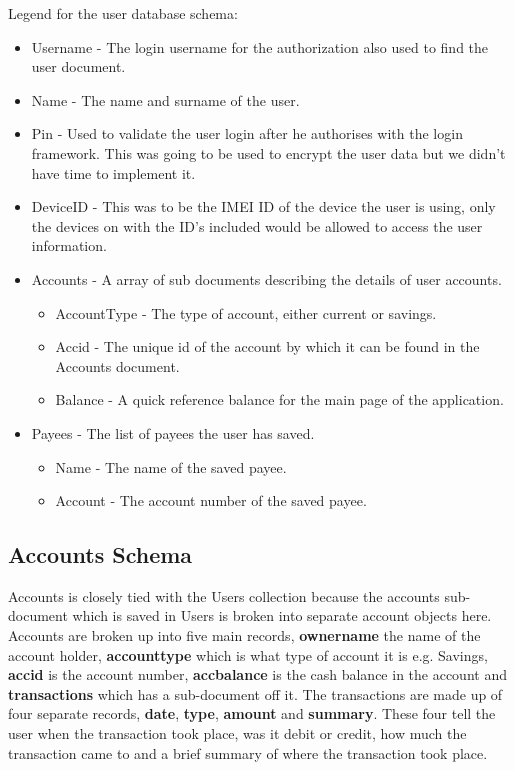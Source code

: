 Legend for the user database schema: 
\begin{itemize}
    \item Username - The login username for the authorization also used to find the user document.
    \item Name - The name and surname of the user.
    \item Pin - Used to validate the user login after he authorises with the login framework. This was going to be used to encrypt the user data but we didn't have time to implement it.
    \item DeviceID - This was to be the IMEI ID of the device the user is using, only the devices on with the ID's included would be allowed to access the user information.
    \item Accounts - A array of sub documents describing the details of user accounts.
        \begin{itemize}
             \item AccountType - The type of account, either current or savings.
             \item Accid - The unique id of the account by which it can be found in the Accounts document.
             \item Balance - A quick reference balance for the main page of the application.
        \end{itemize}
    \item Payees - The list of payees the user has saved.
        \begin{itemize}
            \item Name - The name of the saved payee.
            \item Account - The account number of the saved payee.
        \end{itemize}
\end{itemize}

 
 \subsection{Accounts Schema}
Accounts is closely tied with the Users collection because the accounts sub-document which is saved in Users is broken into separate account objects here. Accounts are broken up into five main records, \textbf{ownername} the name of the account holder, \textbf{accounttype} which is what type of account it is e.g. Savings, \textbf{accid} is the account number, \textbf{accbalance} is the cash balance in the account and \textbf{transactions} which has a sub-document off it. The transactions are made up of four separate records, \textbf{date}, \textbf{type}, \textbf{amount} and \textbf{summary}. These four tell the user when the transaction took place, was it debit or credit, how much the transaction came to and a brief summary of where the transaction took place.\paragraph{}

